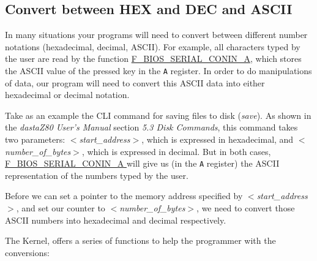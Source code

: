 \documentclass[a4paper,11pt]{article}
\begin{document}
    \subsection{Convert between HEX and DEC and ASCII}
    In many situations your programs will need to convert between different
    number notations (hexadecimal, decimal, ASCII). For example, all characters
    typed by the user are read by the function
    \hyperref[func:fbiosserialconina]{F\_BIOS\_SERIAL\_CONIN\_A}, which stores
    the ASCII value of the pressed key in the \texttt{A} register. In order to
    do manipulations of data, our program will need to convert this ASCII data
    into either hexadecimal or decimal notation.

    Take as an example the CLI command for saving files to disk (\textit{save}).
    As shown in the \textit{dastaZ80 User's Manual} section \textit{5.3 Disk
    Commands}, this command takes two parameters: \textit{$<$start\_address$>$},
    which is expressed in hexadecimal, and \textit{$<$number\_of\_bytes$>$}, which
    is expressed in decimal. But in both cases,
    \hyperref[func:fbiosserialconina]{F\_BIOS\_SERIAL\_CONIN\_A } will give
    us (in the \texttt{A} register) the ASCII representation of the numbers typed
    by the user.

    Before we can set a pointer to the memory address specified by 
    \textit{$<$start\_address$>$}, and set our counter to 
    \textit{$<$number\_of\_bytes$>$}, we need to convert those ASCII numbers
    into hexadecimal and decimal respectively.

    The Kernel, offers a series of functions to help the programmer with the
    conversions:
\end{document}
